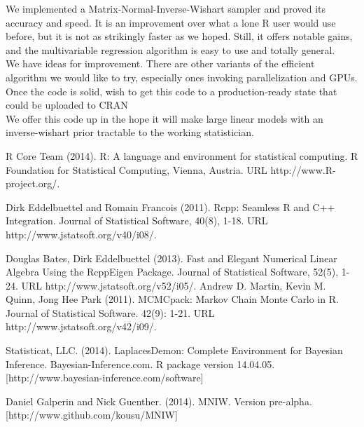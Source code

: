 \documentclass[english]{report}
\begin{document}

We implemented a Matrix-Normal-Inverse-Wishart sampler and proved its accuracy and speed. It is an improvement over what a lone R user would use before, but it is not as strikingly faster as we hoped. Still, it offers notable gains, and the multivariable regression algorithm is easy to use and totally general.\\

We have ideas for improvement. There are other variants of the efficient algorithm we would like to try, especially ones invoking parallelization and GPUs.  Once the code is solid, wish to get this code to a production-ready state that could be uploaded to CRAN \cite{R} \\

We offer this code \cite{MNIW} up in the hope it will make large linear models with an inverse-wishart prior tractable to the working statistician.



\newpage


\begin{thebibliography}{9}

R Core Team (2014). R: A language and environment for statistical computing. R Foundation for
  Statistical Computing, Vienna, Austria. URL http://www.R-project.org/.
  
 Dirk Eddelbuettel and Romain Francois (2011). Rcpp: Seamless R and C++ Integration. Journal of
  Statistical Software, 40(8), 1-18. URL http://www.jstatsoft.org/v40/i08/.

Douglas Bates, Dirk Eddelbuettel (2013). Fast and Elegant Numerical Linear Algebra Using the
  RcppEigen Package. Journal of Statistical Software, 52(5), 1-24. URL
  http://www.jstatsoft.org/v52/i05/.
Andrew D. Martin, Kevin M. Quinn, Jong Hee Park (2011). MCMCpack: Markov Chain Monte Carlo in R.
  Journal of Statistical Software. 42(9): 1-21. URL http://www.jstatsoft.org/v42/i09/. 
 
Statisticat, LLC. (2014). LaplacesDemon: Complete Environment for
  Bayesian Inference. Bayesian-Inference.com. R package version
  14.04.05. [http://www.bayesian-inference.com/software] 
 
Daniel Galperin and Nick Guenther. (2014). MNIW. Version pre-alpha. [http://www.github.com/kousu/MNIW]
 
 \end{thebibliography}
\end{document}
